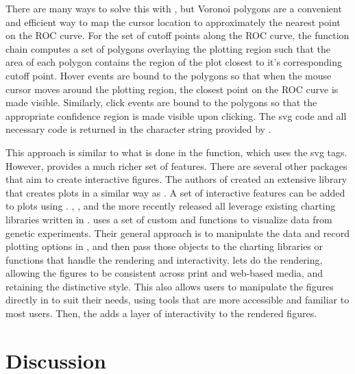 \documentclass[codesnippet]{jss}
\begin{document}
There are many ways to solve this with , but Voronoi polygons
are a convenient and efficient way to map the cursor location to
approximately the nearest point on the ROC curve. For the set of cutoff
points along the ROC curve, the  function chain
computes a set of polygons overlaying the plotting region such that the
area of each polygon contains the region of the plot closest to it's
corresponding cutoff point. Hover events are bound to the polygons so
that when the mouse cursor moves around the plotting region, the closest
point on the ROC curve is made visible. Similarly, click events are
bound to the polygons so that the appropriate confidence region is made
visible upon clicking. The svg code and all necessary
 code is returned in the character string provided
by .

This approach is similar to what is done in the 
 function, which uses the svg 
tags. However,  provides a much richer set of features. There
are several other  packages that aim to create interactive
figures. The authors of  \citep{animint} created an
extensive  library that creates plots in a similar
way as . A set of interactive features can be added to
plots using .  \citep{ggvis}, 
\citep{rcharts}, and the more recently released 
\citep{htmlwidgets} all leverage existing charting libraries written in
.  \citep{qtlcharts} uses a set of
custom  and  functions to visualize data
from genetic experiments. Their general approach is to manipulate the
data and record plotting options in , and then pass those
objects to the charting libraries or functions that handle the rendering
and interactivity.  lets  do the rendering,
allowing the figures to be consistent across print and web-based media,
and retaining the distinctive  style. This also allows users
to manipulate the figures directly in  to suit their needs,
using tools that are more accessible and familiar to most 
users. Then, the  adds a layer of interactivity to
the rendered figures.

\section{Discussion}\label{discussion}
\end{document}
